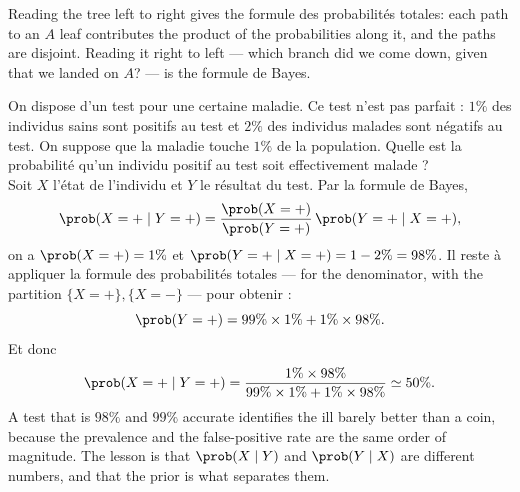 \begin{figure}[h!]
  \centering
\end{figure}

Reading the tree left to right gives the formule des probabilités totales: each
path to an $A$ leaf contributes the product of the probabilities along it, and
the paths are disjoint. Reading it right to left --- which branch did we come
down, given that we landed on $A$? --- is the formule de Bayes.

\begin{example}
  On dispose d'un test pour une certaine maladie. Ce test n'est pas parfait :
  $1\%$ des individus sains sont positifs au test et $2\%$ des individus malades
  sont négatifs au test. On suppose que la maladie touche $1\%$ de la population.
  Quelle est la probabilité qu'un individu positif au test soit effectivement
  malade ?\\

  Soit $X$ l'état de l'individu et $Y$ le résultat du test. Par la formule de
  Bayes,
  \[ \prob(X = +\mid Y = +)
       = \frac{\prob(X=+)}{\prob(Y=+)}\, \prob(Y = + \mid X = +), \]
  on a $\prob(X=+) = 1\%$ et $\prob(Y=+\mid X=+) = 1 - 2\% = 98\%$. Il reste à
  appliquer la formule des probabilités totales --- for the denominator, with
  the partition $\{X=+\}, \{X=-\}$ --- pour obtenir :
  \[ \prob(Y=+) = 99\% \times 1\% + 1\% \times 98\%. \]
  Et donc
  \[ \prob(X = +\mid Y=+)
       = \frac{1\% \times 98\%}{99\% \times 1\% + 1\% \times 98\%}
       \simeq 50\%. \]
  A test that is $98\%$ and $99\%$ accurate identifies the ill barely better than
  a coin, because the prevalence and the false-positive rate are the same order
  of magnitude. The lesson is that $\prob(X \mid Y)$ and $\prob(Y \mid X)$ are
  different numbers, and that the prior is what separates them.
\end{example}

